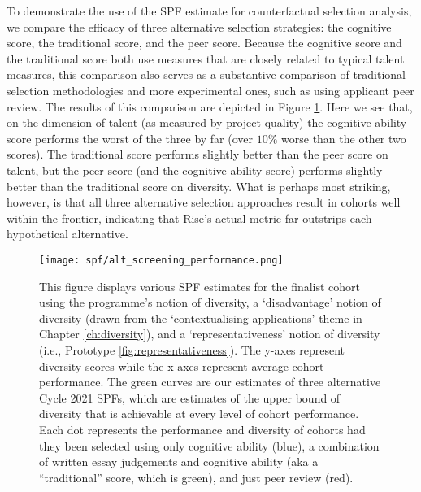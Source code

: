 To demonstrate the use of the SPF estimate for counterfactual selection analysis, we compare the efficacy of three alternative selection strategies: the cognitive score, the traditional score, and the peer score. Because the cognitive score and the traditional score both use measures that are closely related to typical talent measures, this comparison also serves as a substantive comparison of traditional selection methodologies and more experimental ones, such as using applicant peer review. The results of this comparison are depicted in Figure \ref{fig:alt_screen}. Here we see that, on the dimension of talent (as measured by project quality) the cognitive ability score performs the worst of the three by far (over $10\%$ worse than the other two scores). The traditional score performs slightly better than the peer score on talent, but the peer score (and the cognitive ability score) performs slightly better than the traditional score on diversity. What is perhaps most striking, however, is that all three alternative selection approaches result in cohorts well within the frontier, indicating that Rise's actual metric far outstrips each hypothetical alternative.

    \begin{figure}[!htb]
    \centering
    \texttt{[image: spf/alt\_screening\_performance.png]} 
    \caption{This figure displays various SPF estimates for the finalist cohort using the programme's notion of diversity, a `disadvantage' notion of diversity (drawn from the `contextualising applications' theme in Chapter \ref{ch:diversity}), and a `representativeness' notion of diversity (i.e., Prototype \ref{fig:representativeness}). The y-axes represent diversity scores while the x-axes represent average cohort performance. The green curves are our estimates of three alternative Cycle 2021 SPFs, which are estimates of the upper bound of diversity that is achievable at every level of cohort performance. Each dot represents the performance and diversity of cohorts had they been selected using only cognitive ability (blue), a combination of written essay judgements and cognitive ability (aka a ``traditional'' score, which is green), and just peer review (red).} \label{fig:alt_screen}
    \end{figure}

